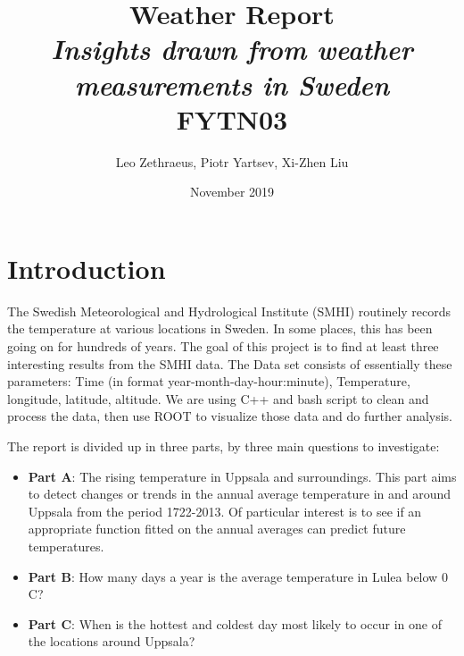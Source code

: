 \documentclass[a4paper]{article}
\begin{document}
\title{Weather Report\\\textit{Insights drawn from weather measurements in Sweden} \\ FYTN03}
\author{Leo Zethraeus, 
Piotr Yartsev, Xi-Zhen Liu} %
\date{November 2019} %
\maketitle
\newpage
\tableofcontents

\newpage

\section{Introduction}\label{sec:intro}
The Swedish Meteorological and Hydrological Institute (SMHI) routinely records the temperature at various locations in Sweden. In some places, this has been going on for hundreds of years. The goal of this project is to find at least three interesting results from the SMHI data. The Data set consists of essentially these parameters: Time (in format year-month-day-hour:minute), Temperature, longitude, latitude, altitude. We are using C++ and bash script to clean and process the data, then use ROOT to visualize those data and do further analysis. 


The report is divided up in three parts, by three main questions to investigate:
\begin{itemize}
\item \textbf{Part A}: The rising temperature in Uppsala and surroundings. This part aims to detect changes or trends in the annual average temperature in and around Uppsala from the period 1722-2013. Of particular interest is to see if an appropriate function fitted on the annual averages can predict future temperatures.\\

\item \textbf{Part B}: How many days a year is the average temperature in Lulea below 0 C\degree?

\item \textbf{Part C}: When is the hottest and coldest day most likely to occur in one of the locations around Uppsala?
\end{itemize}
\end{document}
